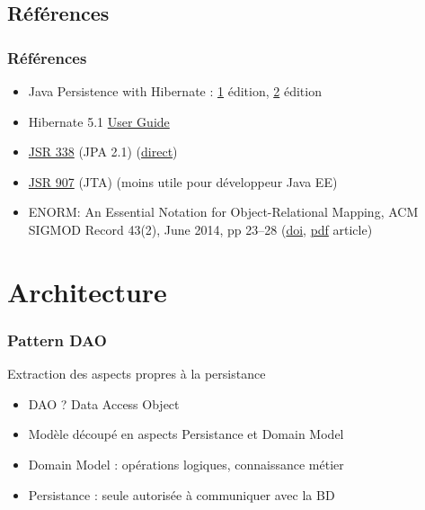 \documentclass[english, french]{beamer}
\begin{document}
\subsection{Références}
\begin{frame}
	\frametitle{Références}
	\begin{itemize}
		\item Java Persistence with Hibernate : \href{http://gen.lib.rus.ec/book/index.php?md5=5D9F8BC8761804C0EBB8FE6A60BCF817}{1\iere} édition, \href{https://www.manning.com/books/java-persistence-with-hibernate-second-edition}{2\ieme} édition
		\item Hibernate 5.1 \href{http://docs.jboss.org/hibernate/orm/5.1/userguide/html_single/Hibernate_User_Guide.html}{User Guide}
		\item \href{https://jcp.org/en/jsr/detail?id=338}{JSR 338} (JPA 2.1) (\href{http://download.oracle.com/otn-pub/jcp/persistence-2_1-fr-eval-spec/JavaPersistence.pdf}{direct})
		\item \href{https://jcp.org/en/jsr/detail?id=907}{JSR 907} (JTA) (moins utile pour développeur Java EE)
		\item ENORM: An Essential Notation for Object-Relational Mapping, ACM SIGMOD Record 43(2), June 2014, pp 23–28 (\href{http://dx.doi.org/10.1145/2694413.2694418}{doi}, \href{http://www.sigmod.org/publications/sigmod-record/1406/pdfs/05.articles.Torres.pdf}{pdf} article)
	\end{itemize}
\end{frame}

\appendix
\AtBeginSection{
}
\section{Architecture}
\begin{frame}
	\frametitle{Pattern DAO}
	Extraction des aspects propres à la persistance
	\begin{itemize}
		\item DAO ? \pause Data Access Object \pause
		\item \og{}Modèle\fg{} découpé en aspects Persistance et Domain Model
		\item Domain Model : opérations logiques, connaissance métier
		\item Persistance : seule autorisée à communiquer avec la BD
	\end{itemize}
	\centering
\end{frame}
\end{document}
